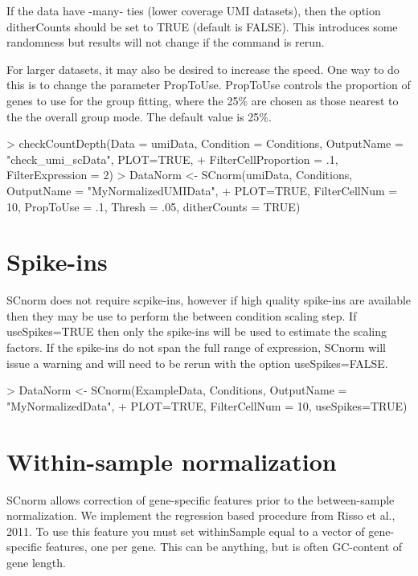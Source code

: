 \documentclass{article}
\begin{document}
If the data have -many- ties (lower coverage UMI datasets), then the option ditherCounts should be set to TRUE (default is FALSE). This introduces some randomness but results will not change if the command is rerun.

For larger datasets, it may also be desired to increase the speed. One way to do this is to change the parameter PropToUse. PropToUse controls the proportion of genes to use for the group fitting, where the 25\% are chosen as those nearest to the the overall group mode. The default value is 25\%. 

\begin{Schunk}
\begin{Sinput}
> checkCountDepth(Data = umiData, Condition = Conditions, OutputName = "check_umi_scData", PLOT=TRUE,
+ FilterCellProportion = .1, FilterExpression = 2)
> DataNorm <- SCnorm(umiData, Conditions, OutputName = "MyNormalizedUMIData",
+ PLOT=TRUE, FilterCellNum = 10, PropToUse = .1, Thresh = .05, ditherCounts = TRUE)
\end{Sinput}
\end{Schunk}

\section{Spike-ins}

SCnorm does not require scpike-ins, however if high quality spike-ins are available then they may be use to perform the between condition scaling step. If useSpikes=TRUE then only the spike-ins will be used to estimate the scaling factors. If the spike-ins do not span the full range of expression, SCnorm will issue a warning and will need to be rerun with the option useSpikes=FALSE.
\begin{Schunk}
\begin{Sinput}
> DataNorm <- SCnorm(ExampleData, Conditions, OutputName = "MyNormalizedData",
+                      PLOT=TRUE, FilterCellNum = 10, useSpikes=TRUE)
\end{Sinput}
\end{Schunk}

\section{Within-sample normalization}

SCnorm allows correction of gene-specific features prior to the between-sample normalization. We implement the regression based procedure from Risso et al., 2011. To use this feature you must set withinSample equal to a vector of gene-specific features, one per gene. This can be anything, but is often GC-content of gene length.
\end{document}
